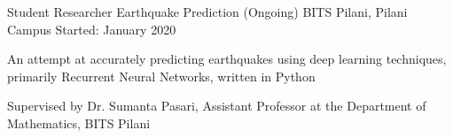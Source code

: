 
\begin{cventries}
  \cventry
    {Student Researcher} %
    {Earthquake Prediction (Ongoing)} %
    {BITS Pilani, Pilani Campus} %
    {Started: January 2020} %
    {
      \begin{cvitems} %
        \item {An attempt at accurately predicting earthquakes using deep learning techniques, primarily Recurrent Neural Networks, written in Python}
		\item {Supervised by Dr. Sumanta Pasari, Assistant Professor at the Department of Mathematics, BITS Pilani}
      \end{cvitems}
    }
\end{cventries}